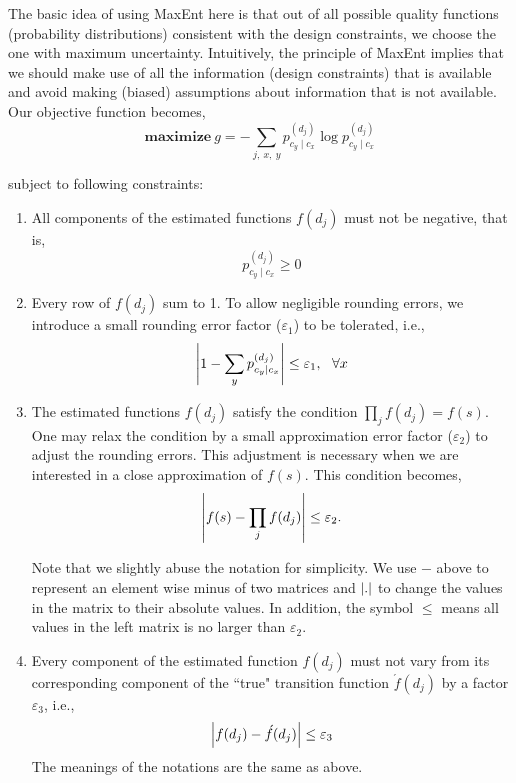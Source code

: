 The basic idea of using MaxEnt here is that out of all possible quality functions (probability distributions) consistent with the design constraints, we choose the one with maximum uncertainty. Intuitively, the principle of MaxEnt implies that we should make use of all the information (design constraints) that is available and avoid making (biased) assumptions about information that is not available. Our objective function becomes,
\begin{equation} \label{objective}
\mathrm{\mathbf{maximize}}~g = -\sum_{j, ~x, ~y} p_{c_y \mid c_x}^{(d_j)} \log p_{c_y \mid c_x}^{(d_j)}
\end{equation}

subject to following constraints:
\begin{enumerate}\itemsep0.5em
\item All components of the estimated functions $f(d_j)$ must not be negative, that is,
\begin{equation}
 p_{c_y \mid c_x}^{(d_j)} \geq 0
\end{equation}
\item Every row of $f(d_j)$ sum to 1. To allow negligible rounding errors, we introduce a small rounding error factor ($\varepsilon_1$) to be tolerated, i.e., 
\begin{equation}
	\left| 1 - \sum_y  p_{c_y \mid c_x}^{(d_j)} \right| \leq \varepsilon_1, \ \ \forall x \label{cons2}
\end{equation}

\item The estimated functions $f(d_j)$ satisfy the condition $\prod_j f(d_j) = f(s)$. One may relax the condition by a small approximation error factor ($\varepsilon_2$) to adjust the rounding errors. This adjustment is necessary when we are interested in a close approximation of $f(s)$. This condition becomes,
\begin{equation}
\left| f(s) - \prod_j f(d_j) \right| \leq \varepsilon_2. \label{con3}
\end{equation}

Note that we slightly abuse the notation for simplicity. We use $-$ above to represent an element wise minus of two matrices and $\left|.\right|$ to change the values in the matrix to their absolute values. In addition, the symbol $\leq$ means all values in the left matrix is no larger than $\varepsilon_2$.

\item Every component of the estimated function $f(d_j)$ must not vary from its corresponding component of the ``true" transition function $\acute{f}(d_j)$ by a factor $\varepsilon_3$, i.e.,
\begin{equation}
\left| f(d_j) - \acute{f}(d_j)\right| \leq \varepsilon_3 \label{con4}
\end{equation}
The meanings of the notations are the same as above.
\end{enumerate}

